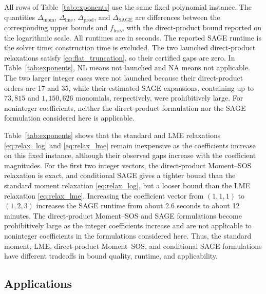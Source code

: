 \documentclass[pdflatex,sn-mathphys-num]{sn-jnl}%
\newcommand{\rd}[1]{{\color{red}#1}}
\theoremstyle{thmstyleone}%
\theoremstyle{thmstyletwo}%
\theoremstyle{thmstylethree}%
\begin{document}
{All rows of Table~\ref{tab:exponents} use the same fixed polynomial
instance. The quantities $\Delta_{\mathrm{mom}}$,
$\Delta_{\mathrm{lme}}$, $\Delta_{\mathrm{prod}}$, and
$\Delta_{\mathrm{SAGE}}$ are differences between the corresponding
upper bounds and $f_{\mathrm{feas}}$, with the direct-product bound
reported on the logarithmic scale. All runtimes are in seconds. The
reported SAGE runtime is the solver time; construction time is excluded.
The two launched direct-product relaxations satisfy
\eqref{eq:flat_truncation}, so their certified gaps are zero. In
Table~\ref{tab:exponents}, NL means not launched and NA means not
applicable. The two larger integer cases were not launched because
their direct-product orders are 17 and 35, while their estimated SAGE
expansions, containing up to $73{,}815$ and $1{,}150{,}626$ monomials,
respectively, were prohibitively large. For noninteger
coefficients, neither the direct-product formulation nor the SAGE
formulation considered here is applicable.

Table~\ref{tab:exponents} shows that the standard and LME
relaxations \eqref{eq:relax_log} and \eqref{eq:relax_lme} remain
inexpensive as the coefficients increase on this fixed instance,
although their observed gaps increase with the coefficient magnitudes.
For the first two integer vectors, the direct-product Moment--SOS
relaxation is exact, and conditional SAGE gives a
tighter bound than the standard moment relaxation
\eqref{eq:relax_log}, but a looser bound than the LME relaxation
\eqref{eq:relax_lme}. Increasing the coefficient vector from
$(1,1,1)$ to $(1,2,3)$ increases the SAGE runtime from about
\rd{2.6} seconds to about 12 minutes.
The direct-product Moment--SOS and SAGE formulations become
prohibitively large as the integer coefficients increase and are not
applicable to noninteger coefficients in the formulations considered
here. Thus, the standard
moment, LME, direct-product Moment--SOS, and conditional SAGE
formulations have different tradeoffs in bound quality, runtime, and
applicability.
}


\subsection{Applications}
\label{sec:app}
\end{document}
